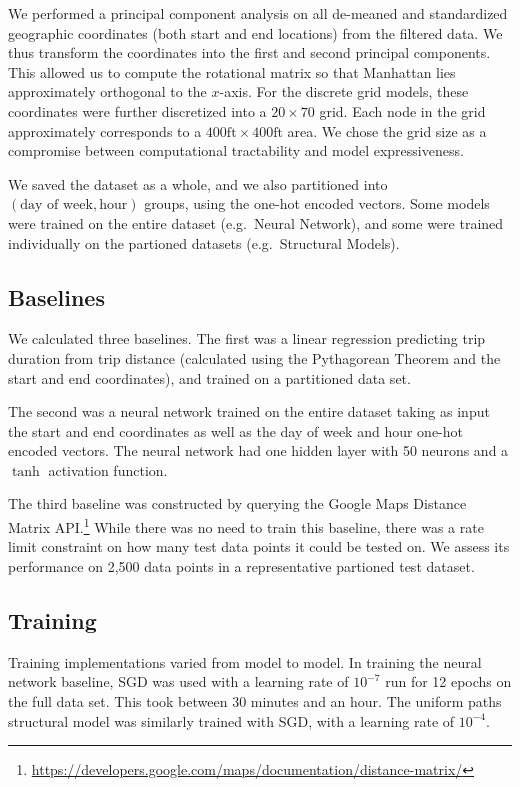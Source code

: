 \documentclass{article}
\begin{document}
We performed a principal component analysis on all de-meaned and
standardized geographic coordinates (both start
and end locations) from the filtered data. We thus transform the coordinates into the first and second principal components. This allowed us to compute the rotational matrix so that Manhattan lies approximately orthogonal to the $x$-axis. For the discrete
grid models, these coordinates were further discretized into a $20 \times 70$
grid. Each node in the grid approximately corresponds to a $400\text{ft} \times 400\text{ft}$ area. We chose the grid size as a compromise between computational tractability and model expressiveness.

We saved the dataset as a whole, and we also partitioned into $(\text{day of week},
\text{hour})$ groups, using the one-hot encoded vectors. Some models were
trained on the entire dataset (e.g.\ Neural Network), and some were trained
individually on the partioned datasets (e.g.\ Structural Models).

\subsection{Baselines}

We calculated three baselines. The first was a linear regression predicting
trip duration from trip distance (calculated using the Pythagorean Theorem and
the start and end coordinates), and trained on a partitioned data set. 

The second was a neural network trained on the
entire dataset taking as input the start and end coordinates as well as the day
of week and hour one-hot encoded vectors. The neural network had one hidden
layer with 50 neurons and a $\tanh$ activation function.

The third baseline was constructed by querying the Google Maps Distance Matrix
API.\footnote{\url{https://developers.google.com/maps/documentation/distance-matrix/}}
While there was no need to train this baseline, there was a rate limit
constraint on how many test data points it could be tested on. We assess its
performance on 2,500 data points in a representative partioned test dataset.

\subsection{Training}

Training implementations varied from model to model. In training the neural
network baseline, SGD was used with a learning rate of $10^{-7}$ run for 12
epochs on the full data set. This took between 30 minutes and an hour. The
uniform paths structural model was similarly trained with SGD, with a learning
rate of $10^{-4}$. 
\end{document}
